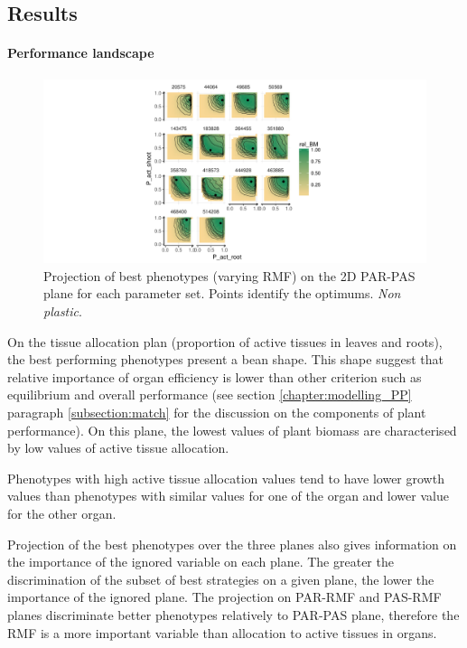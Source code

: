 \subsection{Results}

\paragraph{Performance landscape}

\begin{figure}\label{fig:gravity_shift_resource}
\includegraphics[width = \textwidth]{./2_PP/Figures/Landscape/ld_performance_PAR-PAS.pdf}
\caption{Projection of best phenotypes (varying RMF) on the 2D PAR-PAS plane for each parameter set. Points identify the optimums. \textit{Non plastic}.}
\end{figure}

 On the tissue allocation plan (proportion of active tissues in leaves and roots), the best performing phenotypes present a bean shape. This shape suggest that relative importance of organ efficiency is lower than other criterion such as equilibrium and overall performance (see section \ref{chapter:modelling_PP} paragraph \ref{subsection:match} for the discussion on the components of plant performance). On this plane, the lowest values of plant biomass are characterised by low values of active tissue allocation. 
 
Phenotypes with high active tissue allocation values tend to have lower growth values than phenotypes with similar values for one of the organ and lower value for the other organ. 

Projection of the best phenotypes over the three planes also gives information on the importance of the ignored variable on each plane. The greater the discrimination of the subset of best strategies on a given plane, the lower the importance of the ignored plane. The projection on PAR-RMF and PAS-RMF planes discriminate better phenotypes relatively to PAR-PAS plane, therefore the RMF is a more important variable than allocation to active tissues in organs.

